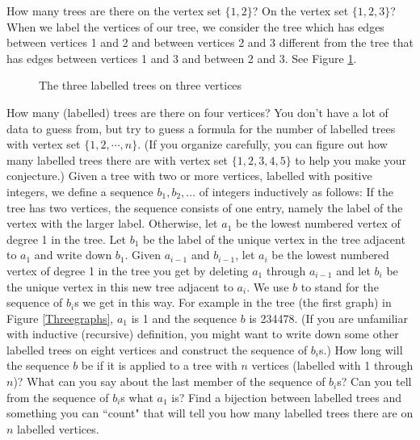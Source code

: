 \itemih  How many trees are there on the vertex set $\{1,2\}$?  On the
vertex set $\{1,2,3\}$?  When we label the vertices of our tree, we
consider the tree which has edges between vertices 1 and 2 and between
vertices 2 and 3 different from the tree that has edges between vertices
1 and 3 and between 2 and 3.  See Figure \ref{differenttrees}.
\begin{figure}[htb]\caption{The three labelled
trees on three vertices}\label{differenttrees}
\begin{center}\mbox{}
\end{center}
\end{figure}  How many
(labelled) trees are there on four vertices?  You don't have a lot of data
to guess from, but try to guess a formula for the number of labelled trees
with vertex set
$\{1,2,\cdots,n\}$.  (If you organize carefully, you can figure out how
many labelled trees there are with vertex set $\{1,2,3,4,5\}$ to help you
make your conjecture.)  Given a tree with two or more vertices, labelled
with positive integers, we define a sequence $b_1,b_2,\ldots$ of
integers inductively as follows:  If the tree has two vertices, the
sequence  consists of one entry, namely the label of the vertex with the
larger label.  Otherwise, let
$a_1$ be the lowest numbered vertex of degree 1 in the tree.  Let $b_1$
be the label of the unique vertex in the tree adjacent to $a_1$ and write
down
$b_1$.  
Given $a_{i-1}$ and $b_{i-1}$, let $a_i$ be the lowest numbered vertex of
degree 1 in the tree you get by deleting $a_1$ through $a_{i-1}$ and let $b_i$
be the unique vertex in this new tree adjacent to $a_i$.
We use $b$ to stand for the sequence of $b_i$s we get in this way. For example
in the tree (the first graph) in Figure
\ref{Threegraphs}, $a_1$ is 1 and the sequence $b$ is 234478. (If you are
unfamiliar with inductive (recursive) definition, you might want to write
down some other labelled trees on eight vertices and construct the
sequence of $b_i$s.) How long will the sequence
$b$ be if it is applied to a tree with
$n$ vertices (labelled with 1 through
$n$)?  What can you say about the last member of the sequence of $b_i$s? 
Can you tell from the sequence of
$b_i$s what
$a_1$ is?  Find a bijection between labelled trees and something you can
``count" that will tell you how many labelled trees there are on $n$
labelled vertices.\label{Prufer}
